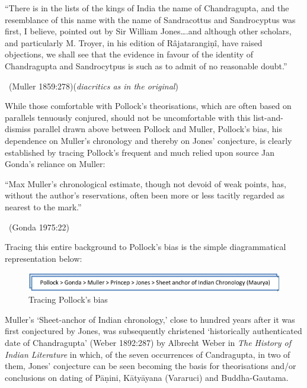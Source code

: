 \begin{myquote}
“There is in the lists of the kings of India the name of Chandragupta, and the resemblance of this name with the name of Sandracottus and Sandrocyptus was first, I believe, pointed out by Sir William Jones….and although other scholars, and particularly M. Troyer, in his edition of Râjatarangiṇî, have raised objections, we shall see that the evidence in favour of the identity of Chandragupta and Sandrocytpus is such as to admit of no reasonable doubt.” 

~\hfill (Muller 1859:278)(\textit{diacritics as in the original})
\end{myquote}

While those comfortable with Pollock’s theorisations, which are often based on parallels tenuously conjured, should not be uncomfortable with this list-and-dismiss parallel drawn above between Pollock and Muller, Pollock’s bias, his dependence on Muller’s chronology and thereby on Jones’ conjecture, is clearly established by tracing Pollock’s frequent and much relied upon source Jan Gonda’s reliance on Muller:

\begin{myquote}
“Max Muller’s chronological estimate, though not devoid of weak points, has, without the author’s reservations, often been more or less tacitly regarded as nearest to the mark.” 

~\hfill (Gonda 1975:22)
\end{myquote}

Tracing this entire background to Pollock’s bias is the simple diagrammatical representation below:

\begin{figure}[!h]
\includegraphics[scale=.45]{images/chap1-fig1.jpg}
\caption{Tracing Pollock’s bias}\label{chap1-fig1}
\end{figure}

Muller’s ‘Sheet-anchor of Indian chronology,’ close to hundred years after it was first conjectured by Jones, was subsequently christened ‘historically authenticated date of Chandragupta’ (Weber 1892:287) by Albrecht Weber in \textit{The History of Indian Literature} in which, of the seven occurrences of Candragupta, in two of them, Jones’ conjecture can be seen becoming the basis for theorisations and/or conclusions on dating of Pāṇini, Kātyāyana (Vararuci) and Buddha-Gautama.

